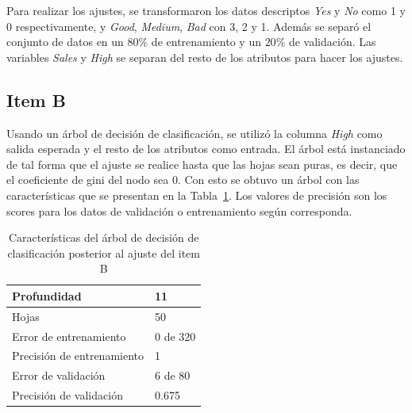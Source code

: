 Para realizar los ajustes, se transformaron los datos descriptos \emph{Yes} y \emph{No} como 1 y 0 respectivamente, y \emph{Good}, \emph{Medium}, \emph{Bad} con 3, 2 y 1. Además se separó el conjunto de datos en un $80\%$ de entrenamiento y un $20\%$ de validación. Las variables \emph{Sales} y \emph{High} se separan del resto de los atributos para hacer los ajustes.

\subsection*{Item B}

Usando un árbol de decisión de clasificación, se utilizó la columna \emph{High} como salida esperada y el resto de los atributos como entrada. El árbol está instanciado de tal forma que  el ajuste se realice hasta que las hojas sean puras, es decir, que el coeficiente de gini del nodo sea 0. Con esto se obtuvo un árbol con las  características que se presentan en la Tabla~\ref{tab:item_B}. Los valores de precisión  son los scores para los datos de validación o entrenamiento según corresponda.

\begin{table}[H]
	\begin{small}
		\begin{center}
			\begin{tabular}[c]{l|l}
				Profundidad & 11 \\ \hline
				Hojas & 50 \\ \hline
				Error de entrenamiento & 0 de 320\\ \hline
				Precisión de entrenamiento & 1 \\ \hline
				Error de validación & 6 de 80\\ \hline
				Precisión de validación & 0.675 \\ 
			\end{tabular}
		\end{center}
	\end{small}
	\caption{Características del árbol de decisión de clasificación posterior al ajuste del item B}
	\label{tab:item_B}
\end{table}

